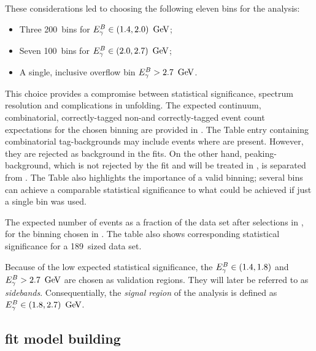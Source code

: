 These considerations led to choosing the following eleven \EB bins for the analysis:
\begin{itemize}
    \item Three 200~\mev bins for ${E^B_{\gamma}}\in(1.4,2.0)~\mathrm{\,Ge\kern -0.1em V}$;
    \item Seven 100~\mev bins for ${E^B_{\gamma}}\in(2.0,2.7)~\mathrm{\,Ge\kern -0.1em V}$;
    \item A single, inclusive overflow bin ${E^B_{\gamma}}>2.7~\mathrm{\,Ge\kern -0.1em V}$.
\end{itemize}
This choice provides a compromise between statistical significance, \EB spectrum resolution and complications in unfolding.
The expected continuum, combinatorial, correctly-tagged non-\BtoXsgamma and correctly-tagged \BtoXsgamma event count expectations for the chosen binning are provided in .
The Table entry containing combinatorial tag-\B backgrounds may include events where \BtoXsgamma are present.
However, they are rejected as background in the \Mbc fits.
On the other hand, peaking-\BB background, which is not rejected by the \Mbc fit and will be treated in , is separated from \BtoXsgamma.
The Table also highlights the importance of a valid binning; several bins can achieve a comparable statistical significance to what could be achieved if just a single bin was used.

\begin{table}[htbp!]
    \caption{\label{tab:expected_events}
    The expected number of events as a fraction of the data set after selections in , for the binning chosen in .
    The table also shows corresponding statistical significance for a 189~\invfb sized data set.
    }
    
\end{table}

Because of the low expected statistical significance, the ${E^B_{\gamma}}\in(1.4,1.8)$ and ${E^B_{\gamma}}>2.7~\mathrm{\,Ge\kern -0.1em V}$ are chosen as validation regions.
They will later be referred to as \textit{sidebands}.
Consequentially, the \textit{signal region} of the analysis is defined as ${E^B_{\gamma}}\in(1.8,2.7)~\mathrm{\,Ge\kern -0.1em V}$.

\subsection{\texorpdfstring{\Mbc}{Mbc} fit model building}\label{sec:fitting_setup}

